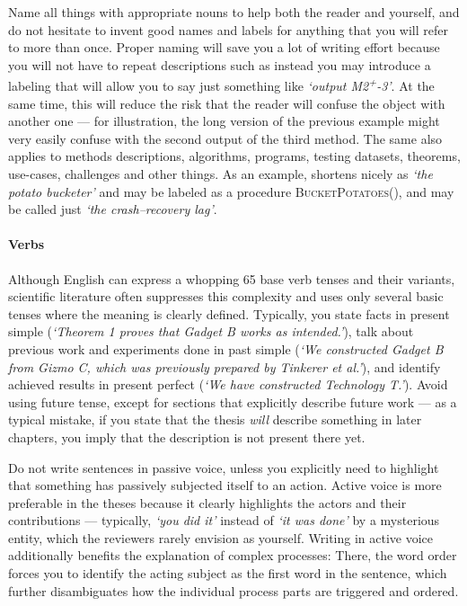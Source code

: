 Name all things with appropriate nouns to help both the reader and yourself, and do not hesitate to invent good names and labels for anything that you will refer to more than once. Proper naming will save you a lot of writing effort because you will not have to repeat descriptions such as  instead you may introduce a labeling that will allow you to say just something like \textit{`output M2\textsuperscript{+}-3'}. At the same time, this will reduce the risk that the reader will confuse the object with another one --- for illustration, the long version of the previous example might very easily confuse with the second output of the third method. The same also applies to methods descriptions, algorithms, programs, testing datasets, theorems, use-cases, challenges and other things. As an example,  shortens nicely as \textit{`the potato bucketer'} and may be labeled as a procedure \textsc{BucketPotatoes()}, and  may be called just \textit{`the crash--recovery lag'}.

\paragraph{Verbs}
Although English can express a whopping 65 base verb tenses and their variants, scientific literature often suppresses this complexity and uses only several basic tenses where the meaning is clearly defined. Typically, you state facts in present simple (\textit{`Theorem 1 proves that Gadget B works as intended.'}), talk about previous work and experiments done in past simple (\textit{`We constructed Gadget B from Gizmo C, which was previously prepared by Tinkerer et al.'}), and identify achieved results in present perfect (\textit{`We have constructed Technology T.'}). Avoid using future tense, except for sections that explicitly describe future work --- as a typical mistake, if you state that the thesis \emph{will} describe something in later chapters, you imply that the description is not present there yet.

Do not write sentences in passive voice, unless you explicitly need to highlight that something has passively subjected itself to an action. Active voice is more preferable in the theses because it clearly highlights the actors and their contributions --- typically, \textit{`you did it'} instead of \textit{`it was done'} by a mysterious entity, which the reviewers rarely envision as yourself. Writing in active voice additionally benefits the explanation of complex processes: There, the word order forces you to identify the acting subject as the first word in the sentence, which further disambiguates how the individual process parts are triggered and ordered.

